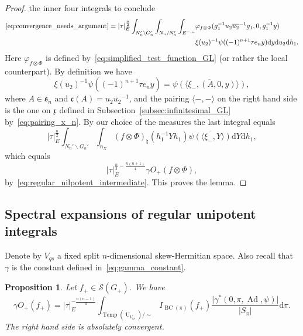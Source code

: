 \documentclass[letterpaper,11pt]{amsart}
\newcommand{\fc}{\mathfrak{c}}
\newcommand{\fn}{\mathfrak{n}}
\newcommand{\fs}{\mathfrak{s}}
\newcommand{\fx}{\mathfrak{x}}
\newcommand{\cS}{\mathcal{S}}
\newcommand{\rd}{\mathrm{d}}
\newcommand{\bs}{\backslash}
\newcommand{\<}{\negthickspace}
\providecommand{\abs}[1]{\lvert#1\rvert}
\DeclareMathOperator{\U}{U}
\DeclareMathOperator{\BC}{BC}
\DeclareMathOperator{\Ad}{Ad}
\DeclareMathOperator{\Temp}{Temp} \DeclareMathOperator{\temp}{temp}
\theoremstyle{definition}
\theoremstyle{plain}
\newtheorem{prop}[definition]{Proposition}
\theoremstyle{remark}
\numberwithin{equation}{section}
\begin{document}
\begin{proof}
the inner four integrals to conclude
    \[
    \begin{aligned}
    \eqref{eq:convergence_needs_argument} = \abs{\tau}_E^{\frac{n}{2}}
    \int_{N_n' \bs G_n'} \int_{N_n/N_n'} \int_{E^{-, n}}
    &\varphi_{f \otimes \Phi}( g_1^{-1}
    u_2 \overline{u_2}^{-1} g_1, 0, g_1^{-1} y)\\
    &\xi(u_2)^{-1} \psi((-1)^{n+1} \tau e_n y)
    \rd y \rd u_2 \rd h_1.
    \end{aligned}
    \]
Here $\varphi_{f \otimes \Phi}$ is defined
by~\eqref{eq:simplified_test_function_GL} (or rather the local counterpart).
By definition we have
    \[
    \xi(u_2)^{-1} \psi((-1)^{n+1} \tau e_n y)
    = \overline{\psi(\langle \xi_-, (A,0, y) \rangle)},
    \]
where $A \in \fs_n$ and $\fc(A) = u_2 \overline{u_2}^{-1}$, and
the pairing $\langle-,-\rangle$ on the right hand side is the one on
$\fx$ defined in Subsection~\ref{subsec:infinitesimal_GL}
by~\eqref{eq:pairing_x_n}. By our choice of the measures the last integral
equals
    \[
    \abs{\tau}_E^{\frac{n}{2}}
    \int_{N_n' \bs G_n'} \int_{\fn_{X}}
    (f \otimes \Phi)_\natural( h_1^{-1} Y h_1)
    \overline{\psi(\langle \xi_-, Y \rangle)}
    \rd Y \rd h_1,
    \]
which equals
    \[
    \abs{\tau}_E^{\frac{n}{2}-\frac{n(n+1)}{4}} \gamma O_+(f \otimes \Phi),
    \]
by~\eqref{eq:regular_nilpotent_intermediate}. This proves the lemma.
\end{proof}


\subsection{Spectral expansions of regular unipotent integrals}

Denote by $V_{qs}$ a fixed split $n$-dimensional skew-Hermitian space.
Also recall that $\gamma$ is the constant defined in~\eqref{eq:gamma_constant}.

\begin{prop}    \label{prop:plancherel_gl}
Let $f_+ \in \cS(G_+)$. We have
    \begin{equation}    \label{eq:plancherel_gl}
    \gamma O_+(f_+) = \abs{\tau}_E^{-\frac{n(n-1)}{4}}
    \int_{\Temp(\U_{V_{qs}})/\sim} I_{\BC(\pi)}(f_+)
    \frac{\abs{\gamma^*(0,\pi, \Ad, \psi)}}{\abs{S_{\pi}}} \rd \pi.
    \end{equation}
The right hand side is absolutely convergent.
\end{prop}
\end{document}
